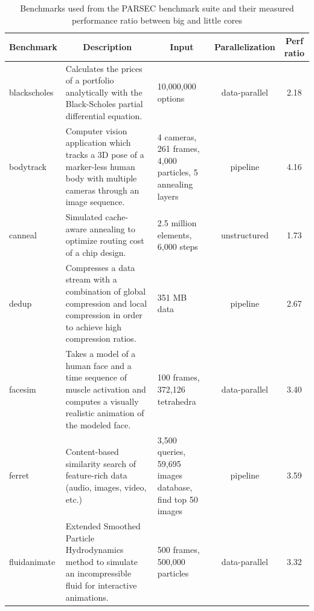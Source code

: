 \begin{table}[!t]
	\centering
	\scriptsize
	\caption{Benchmarks used from the PARSEC benchmark suite and their 
measured performance ratio between big and little cores}
	\setlength{\tabcolsep}{3pt}
	\begin{tabular}{|p{2cm}|p{4.7cm}|p{2.5cm}|c|c|}
	\hline
	\textbf{Benchmark} & \multicolumn{1}{|c|}{\textbf{Description}} & \multicolumn{1}{|c|}{\textbf{Input}} & \textbf{Parallelization} & \multicolumn{1}{|c|}{\textbf{Perf ratio}} \\
	\hline \hline
	blackscholes & Calculates the prices of a portfolio analytically with the Black-Scholes partial differential equation. & 10,000,000 options & data-parallel &2.18 \\ \hline
	bodytrack & Computer vision application which tracks a 3D pose of a marker-less human body with multiple cameras through an image sequence. & 4 cameras, 261 frames, 4,000 particles, 5 annealing layers & pipeline & 4.16 \\ \hline
	canneal & Simulated cache-aware annealing to optimize routing cost of a chip design. & 2.5 million elements, 6,000 steps & unstructured & 1.73 \\ \hline
	dedup & Compresses a data stream with a combination of global compression and local compression in order to achieve high compression ratios. & 351 MB data & pipeline & 2.67 \\ \hline
	facesim & Takes a model of a human face and a time sequence of muscle activation and computes a visually realistic animation of the modeled face. & 100 frames, 372,126 tetrahedra & data-parallel & 3.40 \\ \hline
	ferret & Content-based similarity search of feature-rich data (audio, images, video, etc.) & 3,500 queries, 59,695 images database, find top 50 images & pipeline & 3.59 \\ \hline
	fluidanimate & Extended Smoothed Particle Hydrodynamics method to simulate an 
incompressible fluid for interactive animations. & 500 frames, 500,000 particles & 
data-parallel & 3.32 \\ \hline

\end{tabular}
\end{table}
